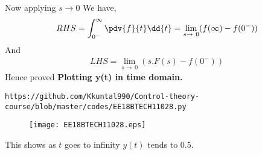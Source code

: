 \begin{enumerate}[label=\thesection.\arabic*.,ref=\thesection.\theenumi]
Now applying $ s \to 0$
We have,
\begin{align}
 RHS =\int_{0^-}^{\infty} \pdv{f}{t}\dd{t} = \lim_{s\to\ 0}(f(\infty) - f(0^{-})) 
\end{align}
And
\begin{align}
    LHS= \lim_{s\to\ 0}(s.F(s)-f(0^{-}))
\end{align}
Hence proved
\newline
\newline
\textbf{Plotting y(t) in time domain.}
\begin{lstlisting}
https://github.com/Kkuntal990/Control-theory-course/blob/master/codes/EE18BTECH11028.py
\end{lstlisting}
\begin{figure}[!h]
  \texttt{[image: EE18BTECH11028.eps]}
\end{figure}

This shows as $t$ goes to infinity $y(t)$ tends to 0.5.
\end{enumerate}
